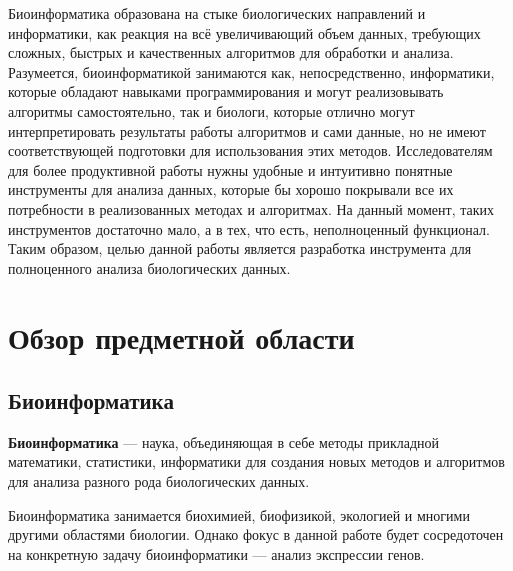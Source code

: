 \documentclass[annotation,specification]{itmo-student-thesis}
\begin{document}


\tableofcontents

\startprefacepage
Биоинформатика образована на стыке биологических направлений и информатики, как реакция на всё увеличивающий объем данных, требующих сложных, быстрых и качественных алгоритмов для обработки и анализа. Разумеется, биоинформатикой занимаются как, непосредственно, информатики, которые обладают навыками программирования и могут реализовывать алгоритмы самостоятельно, так и биологи, которые отлично могут интерпретировать результаты работы алгоритмов и сами данные, но не имеют соответствующей подготовки для использования этих методов. Исследователям для более продуктивной работы нужны удобные и интуитивно понятные инструменты для анализа данных, которые бы хорошо покрывали все их потребности в реализованных методах и алгоритмах. На данный момент, таких инструментов достаточно мало, а в тех, что есть, неполноценный функционал. Таким образом, целью данной работы является разработка инструмента для полноценного анализа биологических данных.

\chapter{Обзор предметной области}

\section{Биоинформатика}

\textbf{Биоинформатика} --- наука, объединяющая в себе методы прикладной математики, статистики, информатики для создания новых методов и алгоритмов для анализа разного рода биологических данных.

Биоинформатика занимается биохимией, биофизикой, экологией и многими другими областями биологии. Однако фокус в данной работе будет сосредоточен на конкретную задачу биоинформатики --- анализ экспрессии генов.
\end{document}
